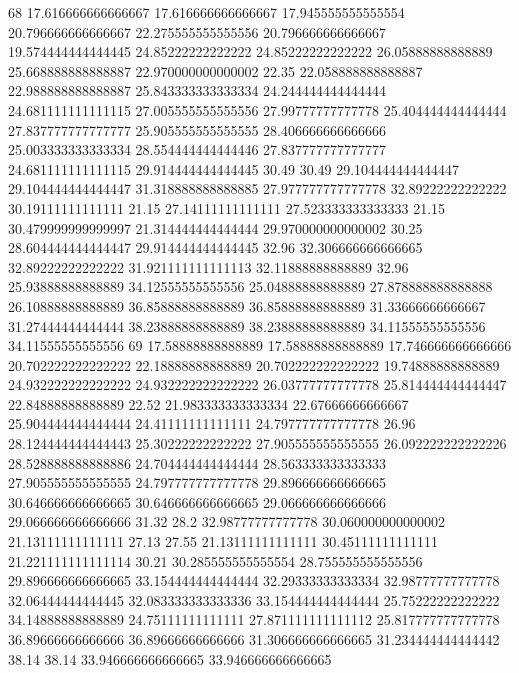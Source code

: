68 17.616666666666667 17.616666666666667 17.945555555555554 20.796666666666667 22.275555555555556 20.796666666666667 19.574444444444445 24.85222222222222 24.85222222222222 26.05888888888889 25.668888888888887 22.970000000000002 22.35 22.058888888888887 22.988888888888887 25.843333333333334 24.244444444444444 24.681111111111115 27.005555555555556 27.99777777777778 25.404444444444444 27.837777777777777 25.905555555555555 28.406666666666666 25.003333333333334 28.554444444444446 27.837777777777777 24.681111111111115 29.914444444444445 30.49 30.49 29.104444444444447 29.104444444444447 31.318888888888885 27.977777777777778 32.89222222222222 30.19111111111111 21.15 27.14111111111111 27.523333333333333 21.15 30.479999999999997 21.314444444444444 29.970000000000002 30.25 28.604444444444447 29.914444444444445 32.96 32.306666666666665 32.89222222222222 31.921111111111113 32.11888888888889 32.96 25.93888888888889 34.12555555555556 25.04888888888889 27.878888888888888 26.10888888888889 36.85888888888889 36.85888888888889 31.33666666666667 31.27444444444444 38.23888888888889 38.23888888888889 34.11555555555556 34.11555555555556
69 17.58888888888889 17.58888888888889 17.746666666666666 20.702222222222222 22.18888888888889 20.702222222222222 19.74888888888889 24.932222222222222 24.932222222222222 26.03777777777778 25.814444444444447 22.84888888888889 22.52 21.983333333333334 22.67666666666667 25.904444444444444 24.41111111111111 24.797777777777778 26.96 28.124444444444443 25.30222222222222 27.905555555555555 26.092222222222226 28.528888888888886 24.704444444444444 28.563333333333333 27.905555555555555 24.797777777777778 29.896666666666665 30.646666666666665 30.646666666666665 29.066666666666666 29.066666666666666 31.32 28.2 32.98777777777778 30.060000000000002 21.13111111111111 27.13 27.55 21.13111111111111 30.45111111111111 21.221111111111114 30.21 30.285555555555554 28.755555555555556 29.896666666666665 33.154444444444444 32.29333333333334 32.98777777777778 32.06444444444445 32.083333333333336 33.154444444444444 25.75222222222222 34.14888888888889 24.75111111111111 27.871111111111112 25.817777777777778 36.89666666666666 36.89666666666666 31.306666666666665 31.234444444444442 38.14 38.14 33.946666666666665 33.946666666666665
